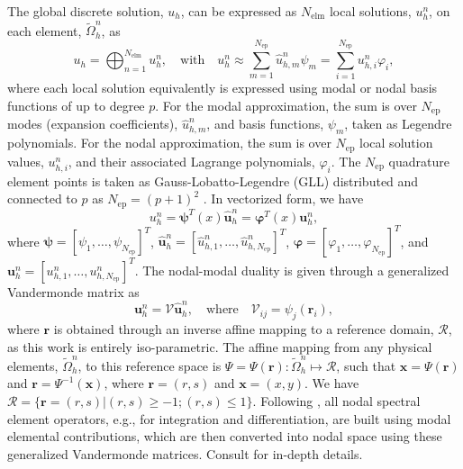 \documentclass{article}
\renewcommand{\phi}{\varphi}
\begin{document}
The global discrete solution, $u_h$, can be expressed as $N_{\text{elm}}$ local solutions, $u_h^n$, on each element, $\tilde{\Omega}^n_h$, as 
\begin{equation}
    u_h = \bigoplus_{n = 1}^{N_{\text{elm}}} u^n_h, \quad \text{with} \quad u^n_h \approx \sum_{m=1}^{N_{\text{ep}}} \hat{u}^n_{h,m} \psi_{m}=\sum_{i=1}^{N_{\text{ep}}} u^n_{h,i} \phi_{i},
\end{equation}
where each local solution equivalently is expressed using modal or nodal basis functions of up to degree $p$. For the modal approximation, the sum is over $N_{\text{ep}}$ modes (expansion coefficients), $\hat{u}^{n}_{h,m}$, and basis functions, $\psi_{m}$, taken as Legendre polynomials. For the nodal approximation, the sum is over $N_{\text{ep}}$ local solution values, $u^n_{h,i}$, and their associated Lagrange polynomials, $\phi_i$. The $N_{\text{ep}}$ quadrature element points is taken as Gauss-Lobatto-Legendre (GLL) distributed and connected to $p$ as $N_{\text{ep}} =(p+1)^2$ \cite{ronquist1987legendre}. In vectorized form, we have
\begin{equation}
    u_h^n = \boldsymbol{\psi}^T(x) \hat{\boldsymbol{u}}^n_h = \boldsymbol{\phi}^T(x) \boldsymbol{u}^n_h,
\end{equation}
where 
$\boldsymbol{\psi} = [\psi_1,\ldots,\psi_{N_{\text{ep}}}]^T$,
$\hat{\boldsymbol{u}}^n_h = [\hat{u}^n_{h,1},\ldots,\hat{u}^n_{h,N_{\text{ep}}}]^T$,
$\boldsymbol{\phi} = [\phi_1,\ldots,\phi_{N_{\text{ep}}}]^T$, and
$\boldsymbol{u}^n_h = [u^n_{h,1},\ldots,u^n_{h,N_{\text{ep}}}]^T$. The nodal-modal duality is given through a generalized Vandermonde matrix as
\begin{equation}
    \boldsymbol{u}^n_h = \boldsymbol{\mathcal{V}} \hat{\boldsymbol{u}}^n_h, \quad \text{where} \quad \boldsymbol{\mathcal{V}}_{ij} = \psi_j(\boldsymbol{r}_i),  
\end{equation}
where $\boldsymbol{r}$ is obtained through an inverse affine mapping to a reference domain, $\mathcal{R}$, as this work is entirely iso-parametric. The affine mapping from any physical elements, $\tilde{\Omega}^n_h$, to this reference space is $\Psi = \Psi(\boldsymbol{r}): \tilde{\Omega}^n_h \mapsto \mathcal{R}$, such that $\boldsymbol{x} = \Psi(\boldsymbol{r})$ and $\boldsymbol{r} = \Psi^{-1}(\boldsymbol{x})$, where $\boldsymbol{r} = (r,s)$ and $\boldsymbol{x} = (x,y)$. We have $\mathcal{R} = \{\boldsymbol{r} = (r,s) | (r, s)  \geq -1 ; (r,s) \leq 1 \}$. Following \cite{hesthaven2008nodal}, all nodal spectral element operators, e.g., for integration and differentiation, are built using modal elemental contributions, which are then converted into nodal space using these generalized Vandermonde matrices. Consult \cite{hesthaven2008nodal} for in-depth details. 
\end{document}
